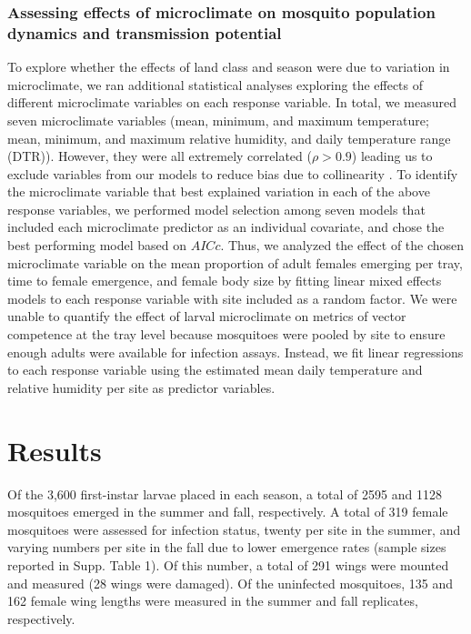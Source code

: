 \documentclass[12pt]{article}
\begin{document}
\subsubsection{Assessing effects of microclimate on mosquito population dynamics and transmission potential}

To explore whether the effects of land class and season were due to variation in microclimate, we ran additional statistical analyses exploring the effects of different microclimate variables on each response variable. In total, we measured seven microclimate variables (mean, minimum, and maximum temperature; mean, minimum, and maximum relative humidity, and daily temperature range (DTR)). However, they were all extremely correlated ($\rho>0.9$) leading us to exclude variables from our models to reduce bias due to collinearity \citep{graham2003}. To identify the microclimate variable that best explained variation in each of the above response variables, we performed model selection among seven models that included each microclimate predictor as an individual covariate, and chose the best performing model based on $AICc$. Thus, we analyzed the effect of the chosen microclimate variable on the mean proportion of adult females emerging per tray, time to female emergence, and female body size by fitting linear mixed effects models to each response variable with site included as a random factor. We were unable to quantify the effect of larval microclimate on metrics of vector competence at the tray level because mosquitoes were pooled by site to ensure enough adults were available for infection assays. Instead, we fit linear regressions to each response variable using the estimated mean daily temperature and relative humidity per site as predictor variables.

\section{Results}

Of the 3,600 first-instar larvae placed in each season, a total of 2595 and 1128 mosquitoes emerged in the summer and fall, respectively. A total of 319 female mosquitoes were assessed for infection status, twenty per site in the summer, and varying numbers per site in the fall due to lower emergence rates (sample sizes reported in Supp. Table 1). Of this number, a total of 291 wings were mounted and measured (28 wings were damaged). Of the uninfected mosquitoes, 135 and 162 female wing lengths were measured in the summer and fall replicates, respectively.
\end{document}
